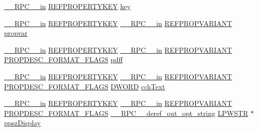 \begin{DoxyCompactItemize}
\item 
\hyperlink{rpcsal_8h_a20b7f6da600a05c8b541659f14f7f0e6}{\+\_\+\+\_\+\+R\+P\+C\+\_\+\+\_\+in} \hyperlink{propkeydef_8h_a3e01280fe3a0b979f5a1926d5a8754af}{R\+E\+F\+P\+R\+O\+P\+E\+R\+T\+Y\+K\+EY} \hyperlink{struct_i_property_system_vtbl_afb175f87c3bab192a7b348375440be97}{key}
\item 
\hyperlink{rpcsal_8h_a20b7f6da600a05c8b541659f14f7f0e6}{\+\_\+\+\_\+\+R\+P\+C\+\_\+\+\_\+in} \hyperlink{propkeydef_8h_a3e01280fe3a0b979f5a1926d5a8754af}{R\+E\+F\+P\+R\+O\+P\+E\+R\+T\+Y\+K\+EY} \hyperlink{rpcsal_8h_a20b7f6da600a05c8b541659f14f7f0e6}{\+\_\+\+\_\+\+R\+P\+C\+\_\+\+\_\+in} \hyperlink{propidl_8h_ac8a8bd0f5f7f9b7e9f8e6fd4fd039fda}{R\+E\+F\+P\+R\+O\+P\+V\+A\+R\+I\+A\+NT} \hyperlink{struct_i_property_system_vtbl_abee13af1ee9cc03b4cf60ff41afb1f32}{propvar}
\item 
\hyperlink{rpcsal_8h_a20b7f6da600a05c8b541659f14f7f0e6}{\+\_\+\+\_\+\+R\+P\+C\+\_\+\+\_\+in} \hyperlink{propkeydef_8h_a3e01280fe3a0b979f5a1926d5a8754af}{R\+E\+F\+P\+R\+O\+P\+E\+R\+T\+Y\+K\+EY} \hyperlink{rpcsal_8h_a20b7f6da600a05c8b541659f14f7f0e6}{\+\_\+\+\_\+\+R\+P\+C\+\_\+\+\_\+in} \hyperlink{propidl_8h_ac8a8bd0f5f7f9b7e9f8e6fd4fd039fda}{R\+E\+F\+P\+R\+O\+P\+V\+A\+R\+I\+A\+NT} \hyperlink{propsys_8h_a2aebc32bcab5d49a6377d14902ec66e2}{P\+R\+O\+P\+D\+E\+S\+C\+\_\+\+F\+O\+R\+M\+A\+T\+\_\+\+F\+L\+A\+GS} \hyperlink{struct_i_property_system_vtbl_a46cf4861829f0e5218b681701c7a3a82}{pdff}
\item 
\hyperlink{rpcsal_8h_a20b7f6da600a05c8b541659f14f7f0e6}{\+\_\+\+\_\+\+R\+P\+C\+\_\+\+\_\+in} \hyperlink{propkeydef_8h_a3e01280fe3a0b979f5a1926d5a8754af}{R\+E\+F\+P\+R\+O\+P\+E\+R\+T\+Y\+K\+EY} \hyperlink{rpcsal_8h_a20b7f6da600a05c8b541659f14f7f0e6}{\+\_\+\+\_\+\+R\+P\+C\+\_\+\+\_\+in} \hyperlink{propidl_8h_ac8a8bd0f5f7f9b7e9f8e6fd4fd039fda}{R\+E\+F\+P\+R\+O\+P\+V\+A\+R\+I\+A\+NT} \hyperlink{propsys_8h_a2aebc32bcab5d49a6377d14902ec66e2}{P\+R\+O\+P\+D\+E\+S\+C\+\_\+\+F\+O\+R\+M\+A\+T\+\_\+\+F\+L\+A\+GS} \hyperlink{mapinls_8h_ad342ac907eb044443153a22f964bf0af}{D\+W\+O\+RD} \hyperlink{struct_i_property_system_vtbl_ab9c1dba738c0a5120026024d79d9be6b}{cch\+Text}
\item 
\hyperlink{rpcsal_8h_a20b7f6da600a05c8b541659f14f7f0e6}{\+\_\+\+\_\+\+R\+P\+C\+\_\+\+\_\+in} \hyperlink{propkeydef_8h_a3e01280fe3a0b979f5a1926d5a8754af}{R\+E\+F\+P\+R\+O\+P\+E\+R\+T\+Y\+K\+EY} \hyperlink{rpcsal_8h_a20b7f6da600a05c8b541659f14f7f0e6}{\+\_\+\+\_\+\+R\+P\+C\+\_\+\+\_\+in} \hyperlink{propidl_8h_ac8a8bd0f5f7f9b7e9f8e6fd4fd039fda}{R\+E\+F\+P\+R\+O\+P\+V\+A\+R\+I\+A\+NT} \hyperlink{propsys_8h_a2aebc32bcab5d49a6377d14902ec66e2}{P\+R\+O\+P\+D\+E\+S\+C\+\_\+\+F\+O\+R\+M\+A\+T\+\_\+\+F\+L\+A\+GS} \hyperlink{rpcsal_8h_a8117c8d086bbc250c5117e81dc347263}{\+\_\+\+\_\+\+R\+P\+C\+\_\+\+\_\+deref\+\_\+out\+\_\+opt\+\_\+string} \hyperlink{mapinls_8h_acc28f72b93422cfd63a60e5a102a77b1}{L\+P\+W\+S\+TR} $\ast$ \hyperlink{struct_i_property_system_vtbl_a1366e91871716f1dcd7b95fea170910a}{ppsz\+Display}

\end{DoxyCompactItemize}
